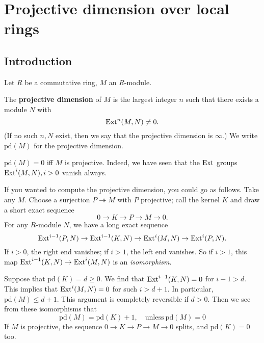 \section{Projective dimension over local rings}

\subsection{Introduction}
\newcommand{\pr}{\mathrm{pd}}
Let $R$ be a commutative ring, $M$ an $R$-module.

\begin{definition}
The \textbf{projective dimension} of $M$ is the largest integer
$n$ such that
there exists  a module $N$ with
\[ \operatorname{Ext}^n(M,N) \neq 0.  \]
(If no such $n,N$ exist, then we say that the projective
dimension is $\infty$.)
We write $\pr(M)$ for the projective dimension.
\end{definition}

\begin{remark}
$\pr(M) = 0$ iff $M$ is projective. Indeed, we have seen that
the $\operatorname{Ext}$ groups
$\operatorname{Ext}^i(M,N), i >0$
vanish always.
\end{remark}

If you wanted to compute the projective dimension, you could go
as follows.
Take any $M$. Choose a surjection $P \twoheadrightarrow M$ with
$P$ projective;
call the kernel $K$ and draw a short exact sequence
\[ 0 \to K \to P \to M \to 0.  \]
For any $R$-module $N$, we have a long exact sequence
\[ \operatorname{Ext}^{i-1}(P,N) \to \operatorname{Ext}^{i-1}(K,N) \to \operatorname{Ext}^i(M,N) \to
\operatorname{Ext}^i(P, N). \]
If $i >0$, the right end vanishes; if $i >1$, the left end
vanishes. So if $i
>1$, this map $\operatorname{Ext}^{i-1}(K,N) \to \operatorname{Ext}^i(M,N)$ is an
\emph{isomorphism}.

Suppose that $\pr(K) = d \geq 0$. We find that
$\operatorname{Ext}^{i-1}(K,N)=0$ for $i-1
> d$.
This implies that $\operatorname{Ext}^i(M,N) = 0$ for such $i > d+1$. In
particular, $\pr(M)
\leq d+1$.
This argument is completely reversible if $d >0$.
Then we see from these isomorphisms that
\[ \boxed{\pr(M) = \pr(K)+1}, \quad \mathrm{unless} \ \pr(M)=0
\]
If $M$ is projective, the sequence $0 \to K \to P \to M \to 0$
splits, and
$\pr(K)=0$ too.


